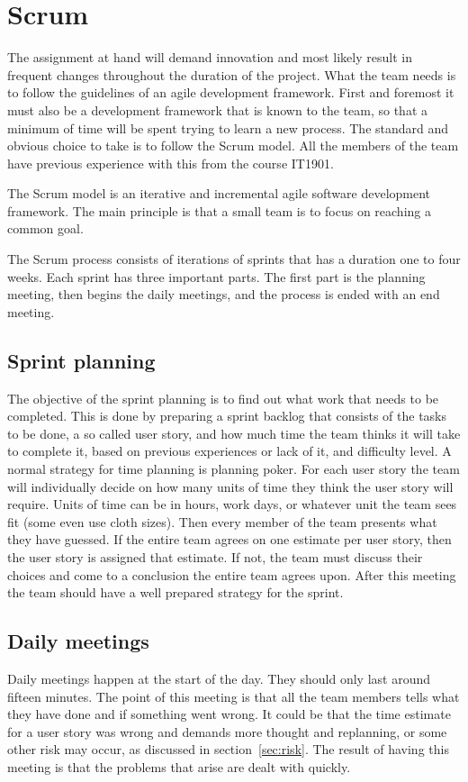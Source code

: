 \section{Scrum}

The assignment at hand will demand innovation and most likely result in frequent changes throughout the duration of the project.
What the team needs is to follow the guidelines of an agile development framework. First and foremost it must also be a development framework that is known to the team,
so that a minimum of time will be spent trying to learn a new process.
The standard and obvious choice to take is to follow the Scrum model. All the members of the team have previous experience with this from the course IT1901.

The Scrum model is an iterative and incremental agile software development framework.
The main principle is that a small team is to focus on reaching a common goal.

The Scrum process consists of iterations of sprints that has a duration one to four weeks. Each sprint has three important parts.
The first part is the planning meeting, then begins the daily  meetings, and the process is ended with an end meeting.

\subsection{Sprint planning}
The objective of the sprint planning is to find out what work that needs to be completed. This is done by preparing a
sprint backlog that consists of the tasks to be done, a so called user story, and how much time the team thinks it 
will take to complete it, based on previous experiences or lack of it, and difficulty level. 
A normal strategy for time planning is planning poker. 
For each user story the team will individually decide on how many units of time they think the user story will require. 
Units of time can be in hours, work days, or whatever unit the team sees fit (some even use cloth sizes).
Then every member of the team presents what they have guessed. If the entire team agrees on one estimate per user story,
then the user story is assigned that estimate. If not, the team must discuss their choices and come to a conclusion 
the entire team agrees upon.
After this meeting the team should have a well prepared strategy for the sprint.

\subsection{Daily meetings}
Daily meetings happen at the start of the day. They should only last around fifteen minutes. 
The point of this meeting is that all the team members tells what they have done and if something went wrong.
It could be that the time estimate for a user story was wrong and demands more thought and replanning, 
or some other risk may occur, as discussed in section~\ref{sec:risk}. 
The result of having this meeting is that the problems that arise are dealt with quickly.

